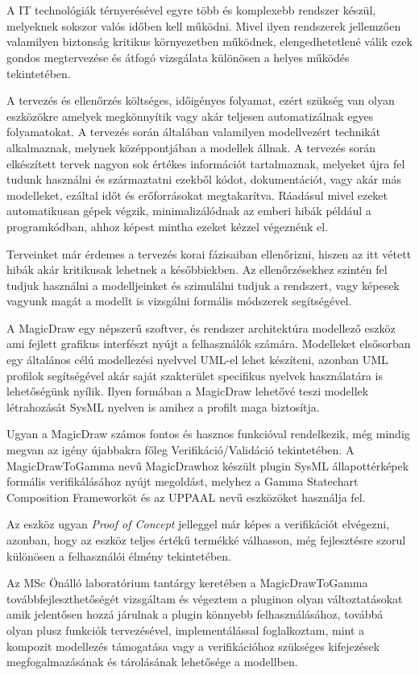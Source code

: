 \chapter{\bevezetes}

A IT technológiák térnyerésével egyre több és komplexebb rendszer készül, melyeknek sokszor valós időben kell működni. Mivel ilyen rendszerek jellemzően valamilyen biztonság kritikus környezetben működnek, elengedhetetlené válik ezek gondos megtervezése és átfogó vizsgálata különösen a helyes működés tekintetében.

A tervezés és ellenőrzés költséges, időigényes folyamat, ezért szükség van olyan eszközökre amelyek megkönnyítik vagy akár teljesen automatizálnak egyes folyamatokat. A tervezés során általában valamilyen modellvezért technikát alkalmaznak, melynek középpontjában a modellek állnak. A tervezés során elkészített tervek nagyon sok értékes információt tartalmaznak, melyeket újra fel tudunk használni és származtatni ezekből kódot, dokumentációt, vagy akár más modelleket, ezáltal időt és erőforrásokat megtakarítva. Ráadásul mivel ezeket automatikusan gépek végzik, minimalizálódnak az emberi hibák például a programkódban, ahhoz képest mintha ezeket kézzel végeznénk el.

Terveinket már érdemes a tervezés korai fázisaiban ellenőrizni, hiszen az itt vétett hibák akár kritikusak lehetnek a későbbiekben. Az ellenőrzésekhez szintén fel tudjuk használni a modelljeinket és szimulálni tudjuk a rendszert, vagy képesek vagyunk magát a modellt is vizsgálni formális módszerek segítségével.

A MagicDraw egy népszerű szoftver, és rendszer architektúra modellező eszköz ami fejlett grafikus interfészt nyújt a felhasználók számára. Modelleket elsősorban egy általános célú modellezési nyelvvel UML-el lehet készíteni, azonban UML profilok segítségével akár saját szakterület specifikus nyelvek használatára is lehetőségünk nyílik. Ilyen formában a MagicDraw lehetővé teszi modellek létrahozását SysML nyelven is amihez a profilt maga biztosítja.

Ugyan a MagicDraw számos fontos és hasznos funkcióval rendelkezik, még mindig megvan az igény újabbakra főleg Verifikáció/Validáció tekintetében. A MagicDrawToGamma nevű MagicDrawhoz készült plugin SysML állapottérképek formális verifikálásához nyújt megoldást, melyhez a Gamma Statechart Composition Frameworköt és az UPPAAL nevű eszközöket használja fel.

Az eszköz ugyan \emph{Proof of Concept} jelleggel már képes a verifikációt elvégezni, azonban, hogy az eszköz teljes értékű termékké válhasson, még fejlesztésre szorul különösen a felhasználói élmény tekintetében.

Az MSc Önálló laboratórium tantárgy keretében a MagicDrawToGamma továbbfejleszthetőségét vizsgáltam és végeztem a pluginon olyan változtatásokat amik jelentősen hozzá járulnak a plugin könnyebb felhasználásához, továbbá olyan plusz funkciók tervezésével, implementálással foglalkoztam, mint a kompozit modellezés támogatása vagy a verifikációhoz szükséges kifejezések megfogalmazásának és tárolásának lehetősége a modellben.
